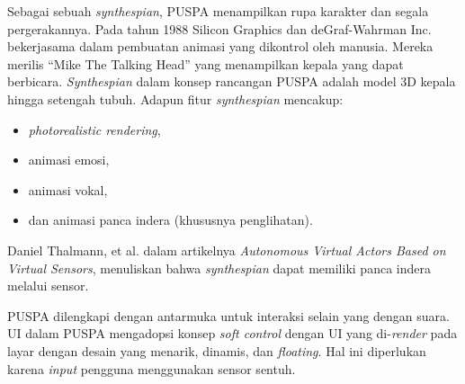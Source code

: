 Sebagai sebuah \textit{synthespian},
PUSPA menampilkan rupa karakter dan segala pergerakannya.
Pada tahun 1988 Silicon Graphics dan deGraf-Wahrman Inc. bekerjasama dalam pembuatan animasi yang dikontrol oleh manusia.
Mereka merilis ``Mike The Talking Head'' yang menampilkan kepala yang dapat berbicara. \textit{Synthespian} dalam konsep rancangan PUSPA adalah model 3D kepala hingga setengah tubuh.
Adapun fitur \textit{synthespian} mencakup:
  \begin{itemize}
	\item \textit{photorealistic rendering},
	\item animasi emosi,
	\item animasi vokal,
	\item dan animasi panca indera (khususnya penglihatan).
  \end{itemize}
Daniel Thalmann, et al. dalam artikelnya \textit{Autonomous Virtual Actors Based on Virtual Sensors}, menuliskan bahwa \textit{synthespian} dapat memiliki panca indera melalui sensor.

PUSPA dilengkapi dengan antarmuka untuk interaksi selain yang dengan suara.
UI dalam PUSPA mengadopsi konsep \textit{soft control} dengan UI yang di-\textit{render} pada layar dengan desain yang menarik, dinamis, dan \textit{floating}.
Hal ini diperlukan karena \textit{input} pengguna menggunakan sensor sentuh.

